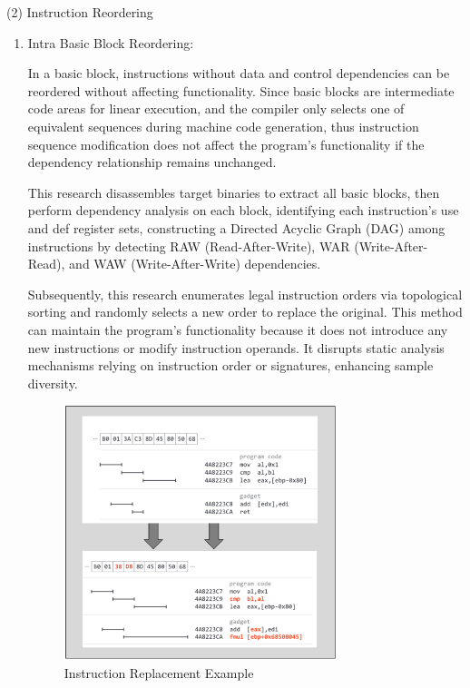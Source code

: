 (2) Instruction Reordering
\begin{enumerate}


\item Intra Basic Block Reordering:

In a basic block, instructions without data and control dependencies can be reordered without affecting functionality. Since basic blocks are intermediate code areas for linear execution, and the compiler only selects one of equivalent sequences during machine code generation, thus instruction sequence modification does not affect the program's functionality if the dependency relationship remains unchanged.

This research disassembles target binaries to extract all basic blocks, then perform dependency analysis on each block, identifying each instruction's use and def register sets, constructing a Directed Acyclic Graph (DAG) among instructions by detecting RAW (Read-After-Write), WAR (Write-After-Read), and WAW (Write-After-Write) dependencies.

Subsequently, this research enumerates legal instruction orders via topological sorting and randomly selects a new order to replace the original. This method can maintain the program's functionality because it does not introduce any new instructions or modify instruction operands. It disrupts static analysis mechanisms relying on instruction order or signatures, enhancing sample diversity.

\begin{figure}[hbt]
	\centering
	\includegraphics[width=0.75\textwidth]{figures/4.2}
	\caption{Instruction Replacement Example }\label{fig:4.2}
\end{figure}


\end{enumerate}
